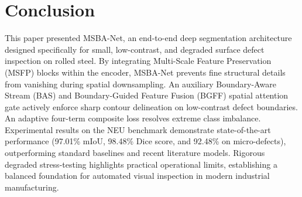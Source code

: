 \documentclass[10pt,a4paper]{article}
\begin{document}
\section{Conclusion}
This paper presented MSBA-Net, an end-to-end deep segmentation architecture designed specifically for small, low-contrast, and degraded surface defect inspection on rolled steel. By integrating Multi-Scale Feature Preservation (MSFP) blocks within the encoder, MSBA-Net prevents fine structural details from vanishing during spatial downsampling. An auxiliary Boundary-Aware Stream (BAS) and Boundary-Guided Feature Fusion (BGFF) spatial attention gate actively enforce sharp contour delineation on low-contrast defect boundaries. An adaptive four-term composite loss resolves extreme class imbalance. Experimental results on the NEU benchmark demonstrate state-of-the-art performance (97.01\% mIoU, 98.48\% Dice score, and 92.48\% on micro-defects), outperforming standard baselines and recent literature models. Rigorous degraded stress-testing highlights practical operational limits, establishing a balanced foundation for automated visual inspection in modern industrial manufacturing.
\end{document}
